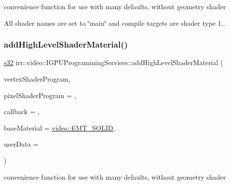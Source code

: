 convenience function for use with many defaults, without geometry shader 

All shader names are set to \char`\"{}main\char`\"{} and compile targets are shader type 1.. \mbox{\label{classirr_1_1video_1_1IGPUProgrammingServices_aeeecb11a1cab75912585b74e5329a593}} 
\subsubsection{\texorpdfstring{add\+High\+Level\+Shader\+Material()}{addHighLevelShaderMaterial()}\hspace{0.1cm}{\footnotesize\ttfamily [4/6]}}
{\footnotesize\ttfamily \hyperlink{namespaceirr_ac66849b7a6ed16e30ebede579f9b47c6}{s32} irr\+::video\+::\+I\+G\+P\+U\+Programming\+Services\+::add\+High\+Level\+Shader\+Material (\begin{DoxyParamCaption}\item[{const \hyperlink{namespaceirr_a9395eaea339bcb546b319e9c96bf7410}{c8} $\ast$}]{vertex\+Shader\+Program,  }\item[{const \hyperlink{namespaceirr_a9395eaea339bcb546b319e9c96bf7410}{c8} $\ast$}]{pixel\+Shader\+Program = {},  }\item[{\hyperlink{classirr_1_1video_1_1IShaderConstantSetCallBack}{I\+Shader\+Constant\+Set\+Call\+Back} $\ast$}]{callback = {},  }\item[{\hyperlink{namespaceirr_1_1video_ac8e9b6c66f7cebabd1a6d30cbc5430f1}{E\+\_\+\+M\+A\+T\+E\+R\+I\+A\+L\+\_\+\+T\+Y\+PE}}]{base\+Material = {\ttfamily \hyperlink{namespaceirr_1_1video_ac8e9b6c66f7cebabd1a6d30cbc5430f1aa0b13db05ac3b5f40e692769de202660}{video\+::\+E\+M\+T\+\_\+\+S\+O\+L\+ID}},  }\item[{\hyperlink{namespaceirr_ac66849b7a6ed16e30ebede579f9b47c6}{s32}}]{user\+Data = {} }\end{DoxyParamCaption})\hspace{0.3cm}{\ttfamily [inline]}}



convenience function for use with many defaults, without geometry shader 

